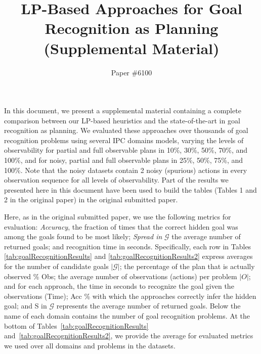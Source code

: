 \documentclass[letterpaper]{article}
\begin{document}
\title{LP-Based Approaches for Goal Recognition as Planning \\ (Supplemental Material)}
\author{
Paper \#6100
}

\maketitle

In this document, we present a supplemental material containing a complete comparison between our LP-based heuristics and the state-of-the-art in goal recognition as planning.
We evaluated these approaches over thousands of goal recognition problems using several IPC domains models, varying the levels of observability for partial and full observable plans in 10\%, 30\%, 50\%, 70\%, and 100\%, and for noisy, partial and full observable plans in 25\%, 50\%, 75\%, and 100\%. Note that the noisy datasets contain 2 noisy (spurious) actions in every observation sequence for all levels of observability.
Part of the results we presented here in this document have been used to build the tables (Tables 1 and 2 in the original paper) in the original submitted paper.

Here, as in the original submitted paper, we use the following metrics for evaluation: \textit{Accuracy}, the fraction of times that the correct hidden goal was among the goals found to be most likely; \textit{Spread in} $\mathcal{G}$ the average number of returned goals; and recognition time in seconds. Specifically, each row in Tables \ref{tab:goalRecognitionResults} and \ref{tab:goalRecognitionResults2} express averages for the number of candidate goals $|\mathcal{G}|$; the percentage of the plan that is actually observed \% Obs; the average number of observations (actions) per problem $|O|$; and for each approach, the time in seconds to recognize the goal given the observations (Time); Acc \% with which the approaches correctly infer the hidden goal; and S in $\mathcal{G}$ represents the average number of returned goals. Below the name of each domain contains the number of goal recognition problems. At the bottom of Tables~\ref{tab:goalRecognitionResults} and~\ref{tab:goalRecognitionResults2}, we provide the average for evaluated metrics we used over all domains and problems in the datasets.
\end{document}
